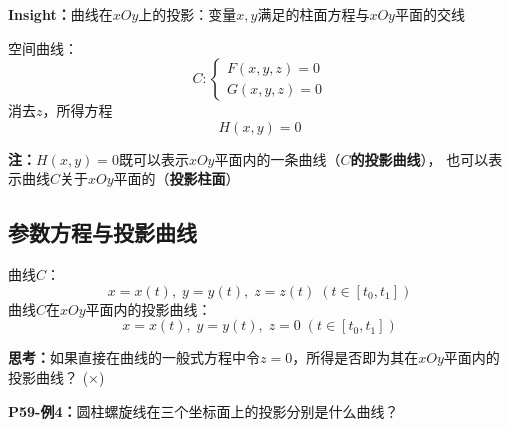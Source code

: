 \begin{center}
\end{center}

{\bf Insight：}曲线在$xOy$上的投影：变量$x,y$满足的柱面方程与$xOy$平面的交线

空间曲线：
$$C:\left\{\begin{array}{l}
	F(x,y,z)=0\\ G(x,y,z)=0
\end{array}\right.$$
消去$z$，所得方程
$$H(x,y)=0$$

{\bf 注：}$H(x,y)=0$既可以表示$xOy$平面内的一条曲线（{\bf $C$的投影曲线}），
也可以表示曲线$C$关于$xOy$平面的（{\bf 投影柱面}）

\subsection{参数方程与投影曲线}

{曲线$C$：}
$$x=x(t),\;y=y(t),\;z=z(t)\;(t\in[t_0,t_1])$$ 
{曲线$C$在$xOy$平面内的投影曲线：}
$$x=x(t),\;y=y(t),\;{z=0}\;(t\in[t_0,t_1])$$ 

{\bf 思考：}如果直接在曲线的一般式方程中令$z=0$，所得是否即为其在$xOy$平面内的投影曲线？
(${\times}$)

{\bf P59-例4：}圆柱螺旋线在三个坐标面上的投影分别是什么曲线？

